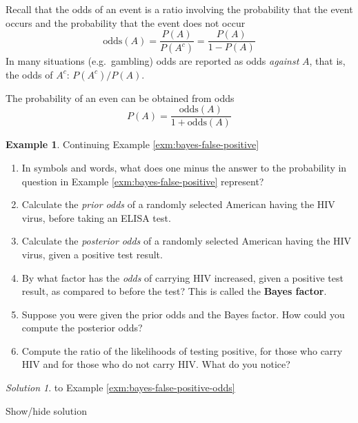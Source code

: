 \documentclass[
]{book}
\providecommand{\tightlist}{%
  \setlength{\itemsep}{0pt}\setlength{\parskip}{0pt}}
\theoremstyle{definition}
\theoremstyle{definition}
\newtheorem{example}{Example}[chapter]
\theoremstyle{definition}
\theoremstyle{remark}
\newtheorem*{solution}{Solution}
\begin{document}
Recall that the odds of an event is a ratio involving the probability that the event occurs and the probability that the event does not occur
\[
\text{odds}(A)  = \frac{P(A)}{P(A^c)} = \frac{P(A)}{1-P(A)}
\]
In many situations (e.g.~gambling) odds are reported as odds \emph{against} \(A\), that is, the odds of \(A^c\): \(P(A^c)/P(A)\).

The probability of an even can be obtained from odds
\[
P(A) = \frac{\text{odds}(A)}{1+\text{odds}(A)}
\]

\begin{example}
\protect\hypertarget{exm:bayes-false-positive-odds}{}{\label{exm:bayes-false-positive-odds} }
Continuing Example \ref{exm:bayes-false-positive}
\end{example}

\begin{enumerate}
\def\labelenumi{\arabic{enumi}.}
\tightlist
\item
  In symbols and words, what does one minus the answer to the probability in question in Example \ref{exm:bayes-false-positive} represent?
\item
  Calculate the \emph{prior odds} of a randomly selected American having the HIV virus, before taking an ELISA test.
\item
  Calculate the \emph{posterior odds} of a randomly selected American having the HIV virus, given a positive test result.
\item
  By what factor has the \emph{odds} of carrying HIV increased, given a positive test result, as compared to before the test? This is called the \textbf{Bayes factor}.
\item
  Suppose you were given the prior odds and the Bayes factor. How could you compute the posterior odds?
\item
  Compute the ratio of the likelihoods of testing positive, for those who carry HIV and for those who do not carry HIV. What do you notice?
\end{enumerate}

\begin{solution}
{}
to Example \ref{exm:bayes-false-positive-odds}
\end{solution}

Show/hide solution
\end{document}
